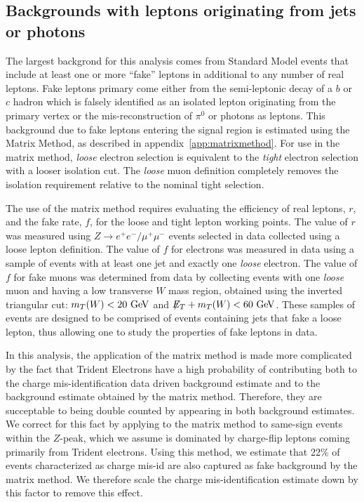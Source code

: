 \subsection{Backgrounds with leptons originating from jets or photons}\label{sect:fakes}

The largest backgrond for this analysis comes from Standard Model events that include at least one or more ``fake'' leptons in additional to any number of real leptons.
Fake leptons primary come either from the semi-leptonic decay of a $b$ or $c$ hadron which is falsely identified as an isolated lepton originating from the primary vertex or the mis-reconstruction of  $\pi^0$ or photons as leptons.
This background due to fake leptons entering the signal region is estimated using the Matrix Method, as described in appendix~\ref{app:matrixmethod}.
For use in the matrix method,  {\it loose} electron selection is equivalent to the {\it tight} 
electron selection with a looser isolation cut.
The {\it loose} muon definition completely removes the isolation requirement relative to the nominal tight selection.

The use of the matrix method requires evaluating the efficiency of real leptons, $r$, and the fake rate, $f$,
for the loose and tight lepton working points.
The value of $r$ was measured using $Z \rightarrow e^+e^-/\mu^+\mu^-$ events selected in data
collected using a loose lepton definition.
The value of $f$ for electrons was measured in data using a sample of events
with at least one jet and exactly one {\it loose} electron.
The value of $f$ for fake muons was determined from data
by collecting events with one {\it loose} muon and having a low transverse $W$ mass region,
obtained using the inverted triangular cut: $m_T(W)<20 \GeV$ and $\met{}+m_T(W)<60 \GeV$.
These samples of events are designed to be comprised of events containing jets that fake
a loose lepton, thus allowing one to study the properties of fake leptons in data.

In this analysis, the application of the matrix method is made more complicated by the fact that
Trident Electrons have a high probability of contributing both to the charge mis-identification data driven background estimate
and to the background estimate obtained by the matrix method.
Therefore, they are succeptable to being double counted by appearing in both background estimates.
We correct for this fact by applying to the matrix method to same-sign events within the $Z$-peak,
which we assume is dominated by charge-flip leptons coming primarily from Trident electrons.
Using this method, we estimate that 22\% of events characterized as charge mis-id are also
captured as fake background by the matrix method.
We therefore scale the charge mis-identification estimate down by this factor to remove this effect.

